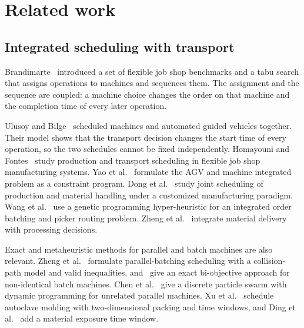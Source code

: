 \section{Related work}
\label{sec:related}

\subsection{Integrated scheduling with transport}

Brandimarte~\cite{brandimarte1993} introduced a set of flexible job shop
benchmarks and a tabu search that assigns operations to machines and
sequences them. The assignment and the sequence are coupled: a machine choice
changes the order on that machine and the completion time of every later
operation.

Ulusoy and Bilge~\cite{ulusoy1993} scheduled machines and automated guided
vehicles together. Their model shows that the transport decision changes the
start time of every operation, so the two schedules cannot be fixed
independently. Homayouni and Fontes~\cite{homayouni2021} study production and
transport scheduling in flexible job shop manufacturing systems. Yao et
al.~\cite{yao2026cp} formulate the AGV and machine integrated problem as a
constraint program. Dong et al.~\cite{dong2026handling} study joint
scheduling of production and material handling under a customized
manufacturing paradigm.  Wang et al.~\cite{wang2025gphh} use a genetic
programming hyper-heuristic for an integrated order batching and picker
routing problem. Zheng et al.~\cite{zheng2025delivery} integrate material
delivery with processing decisions.

Exact and metaheuristic methods for parallel and batch machines are also
relevant. Zheng et al.~\cite{zheng2025formulations} formulate
parallel-batching scheduling with a collision-path model and valid
inequalities, and~\cite{zheng2025biobjective} give an exact bi-objective
approach for non-identical batch machines. Chen et
al.~\cite{chen2026upms} give a discrete particle swarm with dynamic
programming for unrelated parallel machines. Xu et
al.~\cite{xu2026autoclave} schedule autoclave molding with two-dimensional
packing and time windows, and Ding et al.~\cite{ding2024molding} add a
material exposure time window.


